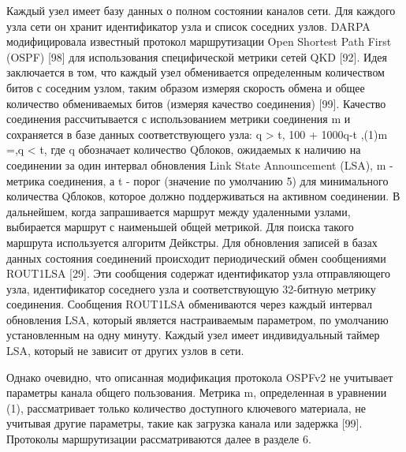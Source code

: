 Каждый узел имеет базу данных о полном состоянии каналов сети. Для каждого узла сети он хранит идентификатор узла и список соседних узлов. DARPA модифицировала известный протокол маршрутизации Open Shortest Path First (OSPF) [98] для использования специфической метрики сетей QKD [92]. Идея заключается в том, что каждый узел обменивается определенным количеством битов с соседним узлом, таким образом измеряя скорость обмена и общее количество обмениваемых битов (измеряя качество соединения) [99].
Качество соединения рассчитывается с использованием метрики соединения m и сохраняется в базе данных соответствующего узла: q > t, 100 + 1000q-t ,(1)m =,q < t, где q обозначает количество Qблоков, ожидаемых к наличию на соединении за один интервал обновления Link State Announcement (LSA), m - метрика соединения, а t - порог (значение по умолчанию 5) для минимального количества Qблоков, которое должно поддерживаться на активном соединении.
В дальнейшем, когда запрашивается маршрут между удаленными узлами, выбирается маршрут с наименьшей общей метрикой. Для поиска такого маршрута используется алгоритм Дейкстры. Для обновления записей в базах данных состояния соединений происходит периодический обмен сообщениями ROUT1LSA [29]. Эти сообщения содержат идентификатор узла отправляющего узла, идентификатор соседнего узла и соответствующую 32-битную метрику соединения. Сообщения ROUT1LSA обмениваются через каждый интервал обновления LSA, который является настраиваемым параметром, по умолчанию установленным на одну минуту. Каждый узел имеет индивидуальный таймер LSA, который не зависит от других узлов в сети.

Однако очевидно, что описанная модификация протокола OSPFv2 не учитывает параметры канала общего пользования. Метрика m, определенная в уравнении (1), рассматривает только количество доступного ключевого материала, не учитывая другие параметры, такие как загрузка канала или задержка [99].
Протоколы маршрутизации рассматриваются далее в разделе 6.

